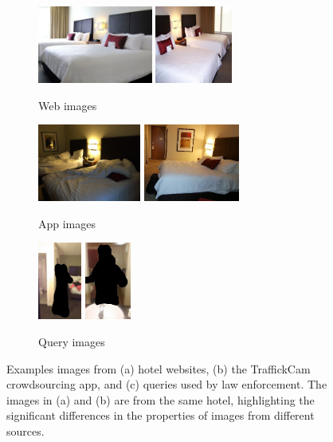 \documentclass[12pt]{article}
\begin{document}
\begin{figure}
    \centering
    \begin{subfigure}[b]{2.55in}
    \includegraphics[height=1in]{figs/exampleDbIms/expedia1.jpg}
    \includegraphics[height=1in]{figs/exampleDbIms/expedia2.jpg}
    \caption{Web images}
    \end{subfigure}
   \begin{subfigure}[b]{2.65in}
    \includegraphics[height=1in]{figs/exampleDbIms/tc1}
    \includegraphics[height=1in]{figs/exampleDbIms/tc2}
    \caption{App images}
    \end{subfigure}
   \begin{subfigure}[b]{1.2in}
    \includegraphics[height=1in]{figs/exampleDbIms/backpage1.jpg}
    \includegraphics[height=1in]{figs/exampleDbIms/backpage2.jpg}
    \caption{Query images}
    \end{subfigure}
    \caption[Image variability from different sources]{Examples images from (a) hotel websites, (b) the TraffickCam crowdsourcing app, and (c) queries used by law enforcement. The images in (a) and (b) are from the same hotel, highlighting the significant differences in the properties of images from different sources.}
    \label{fig:domainImages}
\end{figure}
\end{document}
